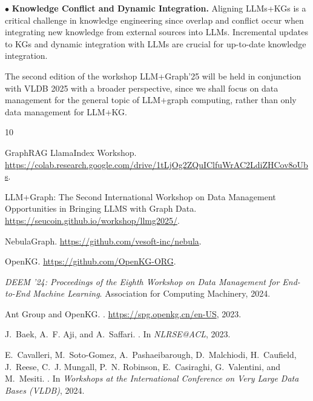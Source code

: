 \documentclass{sig-alternate-10pt}
\begin{document}
\noindent $\bullet$ \textbf{Knowledge Conflict and Dynamic Integration.} Aligning LLMs+KGs is a critical challenge in knowledge engineering since overlap and conflict occur when integrating new knowledge from external sources into LLMs. Incremental updates to KGs and dynamic integration with LLMs are crucial for up-to-date knowledge integration.

The second edition of the workshop LLM+Graph'25 \cite{llmgraph} will be held in conjunction with VLDB 2025 with a broader perspective, since we shall focus on data management for the general topic of LLM+graph computing, rather than only data management for LLM+KG.



\balance

\begin{small}

%
\begin{thebibliography}{10}

\vspace{6mm}

{GraphRAG LlamaIndex Workshop}.
\newblock \url{https://colab.research.google.com/drive/1tLjOg2ZQuIClfuWrAC2LdiZHCov8oUbs}.

{LLM+Graph: The Second International Workshop on Data Management Opportunities in Bringing LLMS with Graph Data}.
\newblock \url{https://seucoin.github.io/workshop/llmg2025/}.

{NebulaGraph}.
\newblock \url{https://github.com/vesoft-inc/nebula}.

{OpenKG}.
\newblock \url{https://github.com/OpenKG-ORG}.

{\em {DEEM '24: Proceedings of the Eighth Workshop on Data Management for End-to-End Machine Learning}}. Association for Computing Machinery, 2024.

{Ant Group and OpenKG}.
.
\newblock \url{https://spg.openkg.cn/en-US}, 2023.

J.~Baek, A.~F. Aji, and A.~Saffari.
.
\newblock In {\em NLRSE@ACL}, 2023.

E.~Cavalleri, M.~Soto-Gomez, A.~Pashaeibarough, D.~Malchiodi, H.~Caufield, J.~Reese, C.~J. Mungall, P.~N. Robinson, E.~Casiraghi, G.~Valentini, and M.~Mesiti.
.
\newblock In {\em Workshops at the International Conference on Very Large Data Bases (VLDB)}, 2024.


\end{thebibliography}
\end{small}
\end{document}
